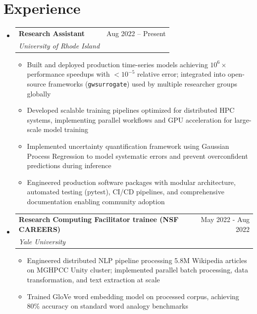 \documentclass[letterpaper,10pt]{article}
\makeatletter
\newcommand{\resumeItem}[1]{
  \item\small{
    {#1 \vspace{-2pt}}
  }
}
\newcommand{\resumeSubheading}[4]{
  \vspace{-2pt}\item
    \begin{tabular*}{0.97\textwidth}[t]{l@{\extracolsep{\fill}}r}
      \textbf{#1} & #2 \\
      \textit{\small#3} & \textit{\small #4} \\
    \end{tabular*}\vspace{-7pt}
}
\newcommand{\resumeSubSubheading}[2]{
    \item
    \begin{tabular*}{0.97\textwidth}{l@{\extracolsep{\fill}}r}
      \textit{\small#1} & \textit{\small #2} \\
    \end{tabular*}\vspace{-7pt}
}
\newcommand{\resumeSubHeadingListStart}{\begin{itemize}[leftmargin=0.15in, label={}]}
\newcommand{\resumeSubHeadingListEnd}{\end{itemize}}
\newcommand{\resumeItemListStart}{\begin{itemize}}
\newcommand{\resumeItemListEnd}{\end{itemize}\vspace{-5pt}}
\makeatother
\begin{document}
\section{Experience}
  \resumeSubHeadingListStart

    \resumeSubheading
      {Research Assistant}{Aug 2022 -- Present}
      {University of Rhode Island}{}
      \resumeItemListStart

        \resumeItem{Built and deployed production time-series models achieving $10^6\times$ performance 
        speedups with $<10^{-5}$ relative error; integrated into open-source frameworks (\texttt{gwsurrogate}) 
        used by multiple researcher groups globally}

        \resumeItem{Developed scalable training pipelines optimized for distributed HPC systems, implementing 
        parallel workflows and GPU acceleration for large-scale model training}

        \resumeItem{Implemented uncertainty quantification framework using Gaussian Process Regression 
        to model systematic errors and prevent overconfident predictions during inference}

        \resumeItem{Engineered production software packages with modular architecture, automated 
        testing (pytest), CI/CD pipelines, and comprehensive documentation enabling community adoption}
        
      \resumeItemListEnd
      
      \vspace{1pt}

    \resumeSubheading
      {Research Computing Facilitator trainee (NSF CAREERS)}{May 2022 - Aug 2022}
      {Yale University}{}
      \resumeItemListStart
        \resumeItem{Engineered distributed NLP pipeline processing 5.8M Wikipedia articles on MGHPCC Unity 
        cluster; implemented parallel batch processing, data transformation, and text extraction at scale}
        \resumeItem{Trained GloVe word embedding model on processed corpus, achieving 
        80\% accuracy on standard word analogy benchmarks}
    \resumeItemListEnd
  \resumeSubHeadingListEnd
\end{document}
